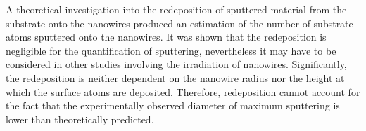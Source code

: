 A theoretical investigation into the redeposition of sputtered material from the substrate onto the nanowires produced an estimation of the number of substrate atoms sputtered onto the nanowires. It was shown that the redeposition is negligible for the quantification of sputtering, nevertheless it may have to be considered in other studies involving the irradiation of nanowires. Significantly, the redeposition is neither dependent on the nanowire radius nor the height at which the surface atoms are deposited. Therefore, redeposition cannot account for the fact that the experimentally observed diameter of maximum sputtering is lower than theoretically predicted.

